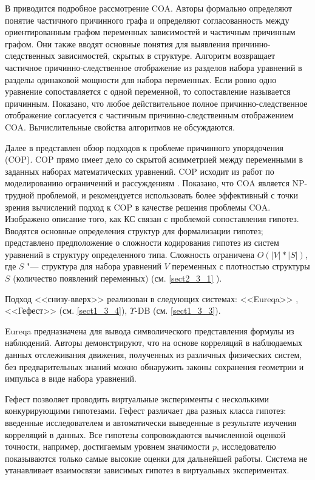 В \cite{dash2008note} приводится подробное рассмотрение COA. Авторы формально определяют понятие 
частичного причинного графа и определяют согласованность между ориентированным графом переменных зависимостей 
и частичным причинным графом. Они также вводят основные понятия для выявления причинно-следственных зависимостей, 
скрытых в структуре. Алгоритм возвращает частичное причинно-следственное отображение из разделов набора уравнений 
в разделы одинаковой мощности для набора переменных. Если ровно одно уравнение сопоставляется с одной переменной, 
то сопоставление называется причинным. Показано, что любое действительное полное причинно-следственное отображение 
согласуется с частичным причинно-следственным отображением COA. Вычислительные свойства алгоритмов не обсуждаются. 

Далее в \cite{Goncalves2016} представлен обзор подходов к проблеме причинного упорядочения (COP). COP прямо имеет 
дело со скрытой асимметрией между переменными в заданных наборах математических уравнений. COP исходит из работ по 
моделированию ограничений и рассуждениям \cite{nayak1994causal}. Показано, что COA является NP-трудной проблемой, и 
рекомендуется использовать более эффективный с точки зрения вычислений подход к COP в качестве решения проблемы COA. 
Изображено описание того, как КС связан с проблемой сопоставления гипотез. Вводятся основные определения структур для 
формализации гипотез; представлено предположение о сложности кодирования гипотез из систем уравнений в структуру 
определенного типа. Сложность ограничена $O(|V|*|S|)$, где $S$ "---  структура для набора уравнений $V$ переменных 
с плотностью структуры $S$ (количество появлений переменных) (см. \cref{sect2_3_1} ).

Подход <<снизу-вверх>> реализован в следующих системах: <<Eureqa>> \cite{Schmidt2009}, 
<<Гефест>> (см. \cref{sect1_3_4}), $\Upsilon$-DB (см. \cref{sect1_3_3}).

Eureqa предназначена для вывода символического представления формулы из наблюдений. Авторы демонстрируют, что на основе 
корреляций в наблюдаемых данных отслеживания движения, полученных из различных физических систем, без предварительных 
знаний можно обнаружить законы сохранения геометрии и импульса в виде набора уравнений.

Гефест позволяет проводить виртуальные эксперименты с несколькими конкурирующими гипотезами. Гефест различает два 
разных класса гипотез: введенные исследователем и автоматически выведенные в результате изучения корреляций в данных. 
Все гипотезы сопровождаются вычисленной оценкой точности, например, достигаемым уровнем значимости $p$, исследователю 
показываются только самые высокие оценки для дальнейшей работы. Система не утанавливает взаимосвязи зависимых гипотез 
в виртуальных экспериментах.

